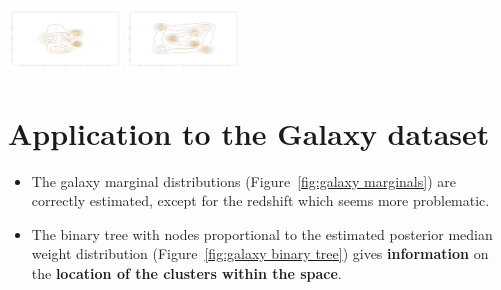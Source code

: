 \documentclass[a0,portrait]{a0poster}
\begin{document}
\begin{multicols}{2}
\begin{center}\vspace{1cm}
    \includegraphics[width=0.225\textwidth]{r10average_ppdSmooth-indFALSE-red.png}
    \includegraphics[width=0.225\textwidth]{r11average_ppdSmooth-indFALSE-red.png}

\end{center}

\begin{center}
    
\end{center}

\vspace{-1cm}

\color{DarkRed}
\section*{Application to the Galaxy dataset}
\label{cpp}
\color{Black}


\begin{itemize}
    \item The galaxy marginal distributions (Figure~\ref{fig:galaxy marginals}) are correctly estimated, except for the redshift which seems more problematic.

    \item The binary tree with nodes proportional to the estimated posterior median weight distribution (Figure~\ref{fig:galaxy binary tree}) gives \textbf{information} on the \textbf{location of the clusters within the space}.
    
\end{itemize}


\end{multicols}
\end{document}
